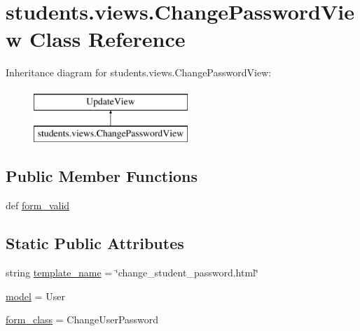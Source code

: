 \hypertarget{classstudents_1_1views_1_1_change_password_view}{\section{students.\-views.\-Change\-Password\-View Class Reference}
\label{classstudents_1_1views_1_1_change_password_view}
}
Inheritance diagram for students.\-views.\-Change\-Password\-View\-:\begin{figure}[H]
\begin{center}
\leavevmode
\includegraphics[height=2.000000cm]{classstudents_1_1views_1_1_change_password_view}
\end{center}
\end{figure}
\subsection*{Public Member Functions}
\begin{DoxyCompactItemize}
\item 
def \hyperlink{classstudents_1_1views_1_1_change_password_view_a4ca0c857f594e8521613d3ef0734a96c}{form\-\_\-valid}
\end{DoxyCompactItemize}
\subsection*{Static Public Attributes}
\begin{DoxyCompactItemize}
\item 
string \hyperlink{classstudents_1_1views_1_1_change_password_view_adf894d4b12b423868347159314d99c8f}{template\-\_\-name} = \char`\"{}change\-\_\-student\-\_\-password.\-html\char`\"{}
\item 
\hyperlink{classstudents_1_1views_1_1_change_password_view_ae00b0734c96a70c9b26cccd21de43835}{model} = User
\item 
\hyperlink{classstudents_1_1views_1_1_change_password_view_aa214f4113b8b57922af5caeba0cc0309}{form\-\_\-class} = Change\-User\-Password
\end{DoxyCompactItemize}


